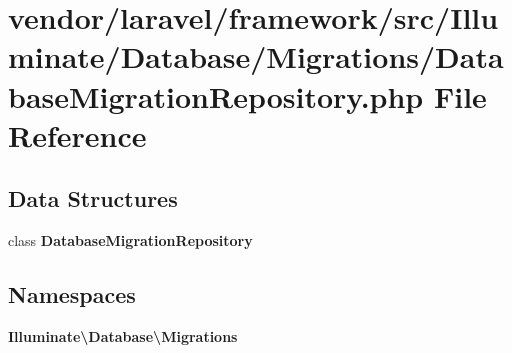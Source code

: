 \section{vendor/laravel/framework/src/\+Illuminate/\+Database/\+Migrations/\+Database\+Migration\+Repository.php File Reference}
\label{_database_migration_repository_8php}
\subsection*{Data Structures}
\begin{DoxyCompactItemize}
\item 
class {\bf Database\+Migration\+Repository}
\end{DoxyCompactItemize}
\subsection*{Namespaces}
\begin{DoxyCompactItemize}
\item 
 {\bf Illuminate\textbackslash{}\+Database\textbackslash{}\+Migrations}
\end{DoxyCompactItemize}
